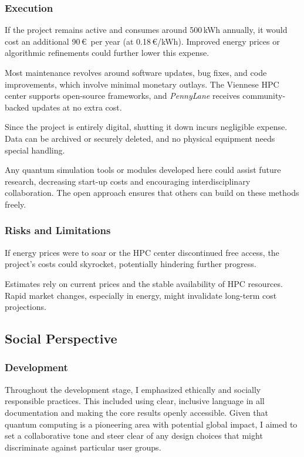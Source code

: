 \subsubsection{Execution}
If the project remains active and consumes around 500\,kWh annually, it would cost an additional 90\,\euro\ per year (at 0.18\,\euro/kWh). Improved energy prices or algorithmic refinements could further lower this expense.

Most maintenance revolves around software updates, bug fixes, and code improvements, which involve minimal monetary outlays. The Viennese HPC center supports open-source frameworks, and \emph{PennyLane} receives community-backed updates at no extra cost.

Since the project is entirely digital, shutting it down incurs negligible expense. Data can be archived or securely deleted, and no physical equipment needs special handling.

Any quantum simulation tools or modules developed here could assist future research, decreasing start-up costs and encouraging interdisciplinary collaboration. The open approach ensures that others can build on these methods freely.


\subsubsection{Risks and Limitations}
If energy prices were to soar or the HPC center discontinued free access, the project’s costs could skyrocket, potentially hindering further progress.

Estimates rely on current prices and the stable availability of HPC resources. Rapid market changes, especially in energy, might invalidate long-term cost projections.

\subsection{Social Perspective}

\subsubsection{Development}
Throughout the development stage, I emphasized ethically and socially responsible practices. This included using clear, inclusive language in all documentation and making the core results openly accessible. Given that quantum computing is a pioneering area with potential global impact, I aimed to set a collaborative tone and steer clear of any design choices that might discriminate against particular user groups.


